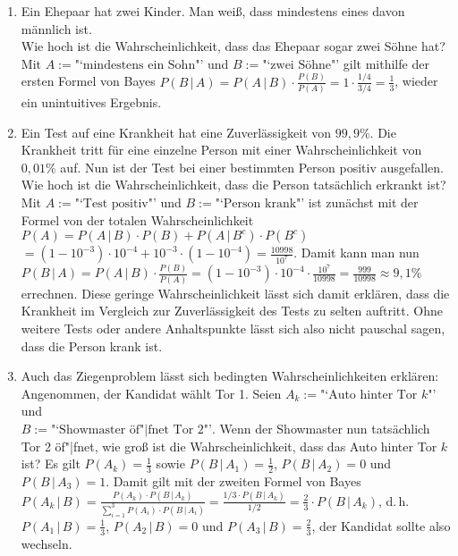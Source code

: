 \begin{Bsp}
    \begin{enumerate}
        \item
        Ein Ehepaar hat zwei Kinder.
        Man weiß, dass mindestens eines davon männlich ist.\\
        Wie hoch ist die Wahrscheinlichkeit, dass das Ehepaar sogar zwei Söhne hat?\\
        Mit $A := \text{"`mindestens ein Sohn"'}$ und $B := \text{"`zwei Söhne"'}$ gilt
        mithilfe der ersten Formel von Bayes
        $P(B \,|\, A) = P(A \,|\, B) \cdot \frac{P(B)}{P(A)} = 1 \cdot \frac{1/4}{3/4} =
        \frac{1}{3}$, wieder ein unintuitives Ergebnis.
        
        \item
        Ein Test auf eine Krankheit hat eine Zuverlässigkeit von $99{,}9\%$.
        Die Krankheit tritt für eine einzelne Person mit einer Wahrscheinlichkeit von
        $0{,}01\%$ auf.
        Nun ist der Test bei einer bestimmten Person positiv ausgefallen.
        Wie hoch ist die Wahrscheinlichkeit, dass die Person tatsächlich erkrankt ist?\\
        Mit $A := \text{"`Test positiv"'}$ und $B := \text{"`Person krank"'}$ ist zunächst
        mit der Formel von der totalen Wahrscheinlichkeit
        $P(A) = P(A \,|\, B) \cdot P(B) + P(A \,|\, B^c) \cdot P(B^c)$\\
        $= (1 - 10^{-3}) \cdot 10^{-4} + 10^{-3} \cdot (1 - 10^{-4}) = \frac{10998}{10^7}$.
        Damit kann man nun\\
        $P(B \,|\, A) = P(A \,|\, B) \cdot \frac{P(B)}{P(A)}
        = (1 - 10^{-3}) \cdot 10^{-4} \cdot \frac{10^7}{10998} =
        \frac{999}{10998} \approx 9{,}1\%$ errechnen.
        Diese geringe Wahrscheinlichkeit lässt sich damit erklären, dass die Krankheit im Vergleich
        zur Zuverlässigkeit des Tests zu selten auftritt.
        Ohne weitere Tests oder andere Anhaltspunkte lässt sich also nicht pauschal sagen, dass
        die Person krank ist.
        
        \item
        Auch das Ziegenproblem lässt sich bedingten Wahrscheinlichkeiten erklären:\\
        Angenommen, der Kandidat wählt Tor 1.
        Seien $A_k := \text{"`Auto hinter Tor } k \text{"'}$ und\\
        $B := \text{"`Showmaster öf"|fnet Tor } 2 \text{"'}$.
        Wenn der Showmaster nun tatsächlich Tor 2 öf"|fnet, wie groß ist die Wahrscheinlichkeit,
        dass das Auto hinter Tor $k$ ist?
        Es gilt $P(A_k) = \frac{1}{3}$ sowie $P(B \,|\, A_1) = \frac{1}{2}$,
        $P(B \,|\, A_2) = 0$ und $P(B \,|\, A_3) = 1$.
        Damit gilt mit der zweiten Formel von Bayes
        $P(A_k \,|\, B) = \frac{P(A_k) \cdot P(B \,|\, A_k)}
        {\sum_{i=1}^3 P(A_i) \cdot P(B \,|\, A_i)} = \frac{1/3 \cdot P(B \,|\, A_k)}{1/2} =
        \frac{2}{3} \cdot P(B \,|\, A_k)$,
        d.\,h. $P(A_1 \,|\, B) = \frac{1}{3}$, $P(A_2 \,|\, B) = 0$ und
        $P(A_3 \,|\, B) = \frac{2}{3}$, der Kandidat sollte also wechseln.
    \end{enumerate}
\end{Bsp}


